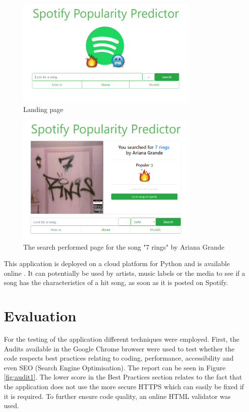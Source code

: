 \begin{figure}[h]
    \centering
        \centering
        \includegraphics[width=0.8\textwidth]{web_application/fig/ui1.PNG} %
        \caption{Landing page}
        \label{fig:ui1}
\end{figure}


\begin{figure}[h]
\centering
\includegraphics[width=0.8\textwidth]{web_application/fig/ui2.PNG} %
\caption{The search performed page for the song "7 rings" by Ariana Grande}
\label{fig:ui2}
\end{figure}

This application is deployed on a cloud platform for Python and is available online \cite{WebApp:online}. It can potentially be used by artists, music labels or the media to see if a song has the characteristics of a hit song, as soon as it is posted on Spotify.

\section{Evaluation}
For the testing of the application different techniques were employed. First, the Audits available in the Google Chrome browser were used to test whether the code respects best practices relating to coding, performance, accessibility and even SEO (Search Engine Optimisation). The report can be seen in Figure \ref{fig:audit1}. The lower score in the Best Practices section relates to the fact that the application does not use the more secure HTTPS which can easily be fixed if it is required. To further ensure code quality, an online HTML validator was used.

